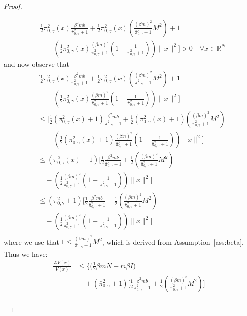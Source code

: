 \documentclass[journal,onecolumn]{IEEEtran}
\newcommand{\reals}{\mathbb{R}}
\newcommand{\dimn}{N}
\newcommand{\gen}{\mathcal{L}}
\newcommand{\ids}{\pi}
\newcommand{\idw}{\gamma}
\newcommand{\isp}{0,\idw}
\newcommand{\idistmaxw}{\bar{\ids}_{\isp}}
\newcommand{\tailbound}{M}
\newcommand{\idiffc}{I}
\newcommand{\dissm}{m}
\newcommand{\dissb}{b}
\newcommand{\idistrw}{\ids_{\isp}}
\newcommand{\larg}{x}
\begin{document}
{\begin{proof}
\begin{enumerate}
\begin{align*}
           & \biggl[ \frac{1}{2}\idistrw^2(\larg) \frac{\beta^2 \dissm \dissb}{\idistmaxw^2+1}  + \frac{1}{2}\idistrw^2(\larg)\left(\frac{(\beta \dissm)^2}{\idistmaxw^2 + 1}\tailbound^2\right) + 1 \\ &\quad - \left(\frac{1}{2}\idistrw^2(\larg)\frac{(\beta \dissm)^2}{\idistmaxw^2+1}\left(1 - \frac{1}{\idistmaxw^2+1}\right) \right)\|\larg\|^2\biggr] > 0\quad \forall \larg \in \reals^{\dimn}
        \end{align*}
        and now observe that
        \begin{align*}
                &\biggl[ \frac{1}{2}\idistrw^2(\larg) \frac{\beta^2 \dissm \dissb}{\idistmaxw^2+1}  + \frac{1}{2}\idistrw^2(\larg)\left(\frac{(\beta \dissm)^2}{\idistmaxw^2 + 1}\tailbound^2\right) + 1 \\&\quad - \left(\frac{1}{2}\idistrw^2(\larg)\frac{(\beta \dissm)^2}{\idistmaxw^2+1}\left(1 - \frac{1}{\idistmaxw^2+1}\right) \right)\|\larg\|^2\biggr]\\
                &\leq \biggl[ \frac{1}{2}(\idistrw^2(\larg)+1) \frac{\beta^2 \dissm \dissb}{\idistmaxw^2+1}  + \frac{1}{2}(\idistrw^2(\larg)+1)\left(\frac{(\beta \dissm)^2}{\idistmaxw^2 + 1}\tailbound^2\right)  \\&\quad - \left(\frac{1}{2}(\idistrw^2(\larg)+1)\frac{(\beta \dissm)^2}{\idistmaxw^2+1}\left(1 - \frac{1}{\idistmaxw^2+1}\right) \right)\|\larg\|^2\biggr] \\
                &\leq (\idistrw^2(\larg)+1)\biggl[ \frac{1}{2} \frac{\beta^2 \dissm \dissb}{\idistmaxw^2+1}  + \frac{1}{2}\left(\frac{(\beta \dissm)^2}{\idistmaxw^2 + 1}\tailbound^2\right) \\&\quad - \left(\frac{1}{2}\frac{(\beta \dissm)^2}{\idistmaxw^2+1}\left(1 - \frac{1}{\idistmaxw^2+1}\right) \right)\|\larg\|^2\biggr] \\
                &\leq (\idistmaxw^2+1)\biggl[ \frac{1}{2} \frac{\beta^2 \dissm \dissb}{\idistmaxw^2+1}  + \frac{1}{2}\left(\frac{(\beta \dissm)^2}{\idistmaxw^2 + 1}\tailbound^2\right) \\&\quad - \left(\frac{1}{2}\frac{(\beta \dissm)^2}{\idistmaxw^2+1}\left(1 - \frac{1}{\idistmaxw^2+1}\right) \right)\|\larg\|^2\biggr] \\
        \end{align*}
        where we use that $1 \leq \frac{(\beta \dissm)^2}{\idistmaxw + 1}\tailbound^2$, which is derived from Assumption~\ref{ass:beta}. 
        Thus we have:
        \begin{align*}
                \frac{\gen V(\larg)}{V(\larg)} & \leq \biggl\{\biggl(\frac{1}{2} \beta \dissm \dimn  + \dissm \beta \idiffc \biggr)  \\&\quad + (\idistmaxw^2+1)\biggl[ \frac{1}{2} \frac{\beta^2\dissm \dissb}{\idistmaxw^2+1}  + \frac{1}{2}\left(\frac{(\beta\dissm)^2}{\idistmaxw^2 + 1}\tailbound^2\right) \biggr] \\

\end{align*}
\end{enumerate}
\end{proof}}
\end{document}
